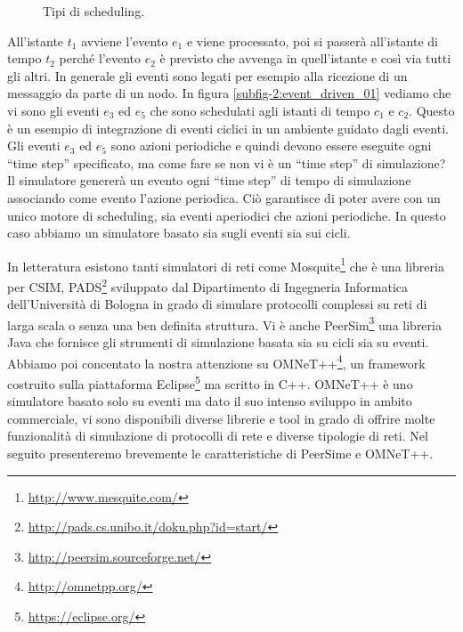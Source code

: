 \begin{figure}[t]
	\centering
	\vfill
	\caption[Scheduling cycle and event driven]{Tipi di scheduling.}
	\label{fig:scheduling_type}
\end{figure}

All'istante $t_1$ avviene l'evento $e_1$ e viene processato, poi si passerà all'istante di tempo $t_2$ perché l'evento $e_2$ è previsto che avvenga in quell'istante e così via tutti gli altri. In generale gli eventi sono legati per esempio alla ricezione di un messaggio da parte di un nodo. In figura \ref{subfig-2:event_driven_01} vediamo che vi sono gli eventi $e_3$ ed $e_5$ che sono schedulati agli istanti di tempo $c_1$ e $c_2$. Questo è un esempio di integrazione di eventi ciclici in un ambiente guidato dagli eventi. Gli eventi $e_3$ ed $e_5$ sono azioni periodiche e quindi devono essere eseguite ogni “time step” specificato, ma come fare se non vi è un “time step” di simulazione? Il simulatore genererà un evento ogni “time step” di tempo di simulazione associando come evento l'azione periodica. Ciò garantisce di poter avere con un unico motore di scheduling, sia eventi aperiodici che azioni periodiche. In questo caso abbiamo un simulatore basato sia sugli eventi sia sui cicli.

In letteratura esistono tanti simulatori di reti come Mosquite\footnote{\url{http://www.mesquite.com/}} che è una libreria per CSIM, PADS\footnote{\url{http://pads.cs.unibo.it/doku.php?id=start/}} sviluppato dal Dipartimento di Ingegneria Informatica dell'Università di Bologna in grado di simulare protocolli complessi su reti di larga scala o senza una ben definita struttura. Vi è anche PeerSim\footnote{\url{http://peersim.sourceforge.net/}} una libreria Java che fornisce gli strumenti di simulazione basata sia su cicli sia su eventi. Abbiamo poi concentato la nostra attenzione su OMNeT++\footnote{\url{http://omnetpp.org/}}, un framework costruito sulla piattaforma Eclipse\footnote{\url{https://eclipse.org/}} ma scritto in C++. OMNeT++ è uno simulatore basato solo su eventi ma dato il suo intenso sviluppo in ambito commerciale, vi sono disponibili diverse librerie e tool in grado di offrire molte funzionalità di simulazione di protocolli di rete e diverse tipologie di reti. Nel seguito presenteremo brevemente le caratteristiche di PeerSime e OMNeT++.

